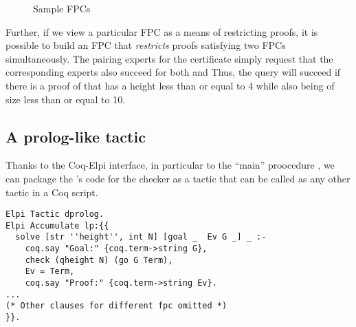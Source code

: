 \begin{figure}[t]


\caption{Sample FPCs}
\label{fig:resources}
\end{figure}

Further, if we view a particular FPC as a means of restricting proofs, it is
possible to build an FPC that \emph{restricts} proofs satisfying two FPCs
simultaneously.
%
%
The pairing experts for the certificate  simply
request that the corresponding experts also succeed for both
 and  
%
Thus, the query 
will succeed if there is a proof of  that has a height less
than or equal to 4 while also being of size less than or equal to 10.



\subsection{A prolog-like tactic}

Thanks to the Coq-Elpi interface, in particular to the ``main''
proocedure , we can package the \lP's code for the checker
as a tactic that can be called as any other tactic in a Coq script.

\begin{lstlisting}[deletekeywords={goal}]
Elpi Tactic dprolog.
Elpi Accumulate lp:{{
  solve [str ''height'', int N] [goal _  Ev G _] _ :-
    coq.say "Goal:" {coq.term->string G},
    check (qheight N) (go G Term),
    Ev = Term,
    coq.say "Proof:" {coq.term->string Ev}.
...
(* Other clauses for different fpc omitted *)
}}.
\end{lstlisting}


